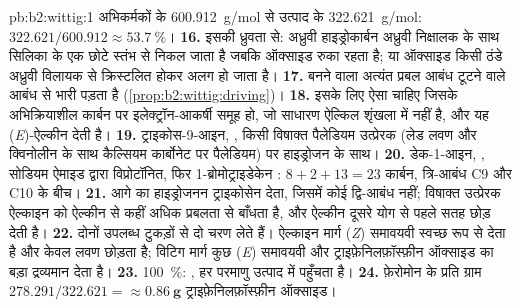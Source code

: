 \begin{solution}{pb:b2:wittig:1}
अभिकर्मकों के \qty{600.912}{g/mol} से उत्पाद के \qty{322.621}{g/mol}: $322.621/600.912 \approx
53.7~\%$।
\textbf{16.} इसकी ध्रुवता से: अध्रुवी हाइड्रोकार्बन अध्रुवी निक्षालक के साथ सिलिका के एक छोटे स्तंभ से
निकल जाता है जबकि ऑक्साइड रुका रहता है; या ऑक्साइड किसी ठंडे अध्रुवी विलायक से क्रिस्टलित होकर अलग हो जाता है।
\textbf{17.} बनने वाला अत्यंत प्रबल  आबंध टूटने वाले  आबंध से भारी पड़ता है
(\cref{prop:b2:wittig:driving})।
\textbf{18.} इसके लिए ऐसा  चाहिए जिसके अभिक्रियाशील कार्बन पर इलेक्ट्रॉन-आकर्षी समूह हो, जो
साधारण ऐल्किल शृंखला में नहीं है, और यह (\textit{E})-ऐल्कीन देती है।
\textbf{19.} ट्राइकोस-9-आइन, , किसी विषाक्त पैलेडियम
उत्प्रेरक (लेड लवण और क्विनोलीन के साथ कैल्सियम कार्बोनेट पर पैलेडियम) पर हाइड्रोजन के साथ।
\textbf{20.} डेक-1-आइन, , सोडियम ऐमाइड द्वारा विप्रोटॉनित, फिर 1-ब्रोमोट्राइडेकेन
: $8 + 2 + 13 = 23$ कार्बन, त्रि-आबंध C9 और C10 के बीच।
\textbf{21.} आगे का हाइड्रोजनन ट्राइकोसेन देता, जिसमें कोई द्वि-आबंध नहीं; विषाक्त उत्प्रेरक
ऐल्काइन को ऐल्कीन से कहीं अधिक प्रबलता से बाँधता है, और ऐल्कीन दूसरे योग से पहले सतह छोड़ देती है।
\textbf{22.} दोनों उपलब्ध टुकड़ों से दो चरण लेते हैं। ऐल्काइन मार्ग (\textit{Z}) समावयवी
स्वच्छ रूप से देता है और केवल लवण छोड़ता है; विटिग मार्ग कुछ (\textit{E}) समावयवी और
ट्राइफ़ेनिलफ़ॉस्फ़ीन ऑक्साइड का बड़ा द्रव्यमान देता है।
\textbf{23.} 100~\%: , हर परमाणु उत्पाद में पहुँचता है।
\textbf{24.} फ़ेरोमोन के प्रति ग्राम $278.291/322.621 = \boldsymbol{\approx \qty{0.86}{g}}$
ट्राइफ़ेनिलफ़ॉस्फ़ीन ऑक्साइड।
\end{solution}
